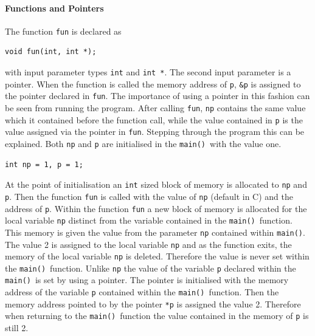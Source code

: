 \documentclass[11pt]{scrartcl}
\def\main{\texttt{main()}}
\begin{document}
\paragraph{Functions and Pointers}
The function \texttt{fun} is declared as 
\begin{lstlisting}
void fun(int, int *);
\end{lstlisting}
with input parameter types \texttt{int} and \texttt{int *}.  The
second input parameter is a pointer.  When the function is called the
memory address of \texttt{p}, \texttt{\&p} is assigned to the pointer
declared in \texttt{fun}.  The importance of using a pointer in this
fashion can be seen from running the program.  After calling
\texttt{fun}, \texttt{np} contains the same value which it contained
before the function call, while the value contained in \texttt{p} is
the value assigned via the pointer in
\texttt{fun}.  Stepping through the program this can be explained.
Both \texttt{np} and \texttt{p} are initialised in the \main\ with the
value one.
\begin{lstlisting}
int np = 1, p = 1;
\end{lstlisting}
At the point of initialisation an \texttt{int} sized block of memory
is allocated to \texttt{np} and \texttt{p}.  Then the function
\texttt{fun} is called with the value of \texttt{np} (default in C) and the
address of \texttt{p}.  Within the function \texttt{fun} a new block
of memory is allocated for the local variable \texttt{np} distinct
from the variable contained in the \main\ function.  This memory is
given the value from the parameter \texttt{np} contained within
\main.  The value 2 is assigned to the local variable \texttt{np}
and as the function exits, the memory of the local variable \texttt{np}
is deleted.  Therefore the value is never set within the \main\
function.  Unlike \texttt{np} the value of the variable \texttt{p}
declared within
the \main\ is set by using a pointer.  The pointer is initialised with the
memory address of the variable \texttt{p} contained within the \main\
function.  Then the memory address pointed to by the pointer
\texttt{*p} is assigned the value 2.  Therefore when returning to the
\main\ function the value contained in the memory of \texttt{p} is
still 2.
\end{document}
